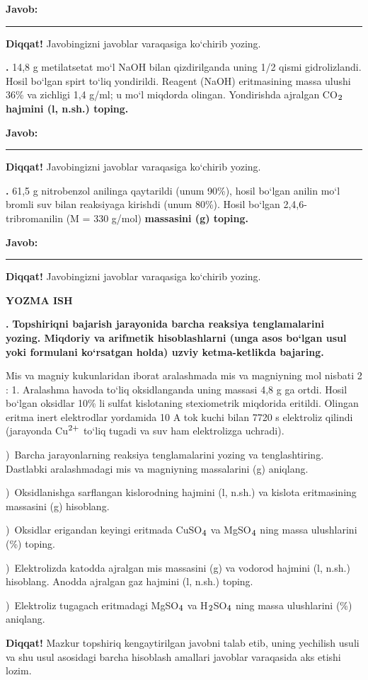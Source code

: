 \documentclass[11pt,a4paper]{article}
\renewcommand{\textsubscript}[1]{\ensuremath{_{\text{\fontsize{8}{8}\selectfont #1}}}}
\renewcommand{\textsuperscript}[1]{\ensuremath{^{\text{\fontsize{8}{8}\selectfont #1}}}}
\newcommand{\qn}[1]{\textbf{\fontsize{11.5}{13}\selectfont #1}}
\newcommand{\qsep}{\par\vspace{13pt}}
\newcommand{\diqqat}[1]{\par\smallskip\noindent\textbf{Diqqat!} #1\par\medskip}
\newcommand{\javob}{\par\nopagebreak[4]\smallskip\noindent\textbf{Javob:} \rule[-2pt]{7.5cm}{0.4pt}\par\smallskip\noindent\textbf{Diqqat!} Javobingizni javoblar varaqasiga ko`chirib yozing.\par\medskip}
\begin{document}
\javob\qsep
\noindent\qn{39.} 14,8 g metilatsetat mo`l NaOH bilan qizdirilganda uning 1/2 qismi gidrolizlandi. Hosil bo`lgan spirt to`liq yondirildi. Reagent (NaOH) eritmasining massa ulushi 36\% va zichligi 1,4 g/ml; u mo`l miqdorda olingan. Yondirishda ajralgan CO\textsubscript{2} \textbf{hajmini (l, n.sh.) toping.}
\javob\qsep
\noindent\qn{40.} 61,5 g nitrobenzol anilinga qaytarildi (unum 90\%), hosil bo`lgan anilin mo`l bromli suv bilan reaksiyaga kirishdi (unum 80\%). Hosil bo`lgan 2,4,6-tribromanilin (M = 330 g/mol) \textbf{massasini (g) toping.}
\javob\qsep
\par\bigskip\begin{center}\textbf{\fontsize{13}{15}\selectfont YOZMA ISH}\end{center}
\noindent\qn{41.} \textbf{Topshiriqni bajarish jarayonida barcha reaksiya tenglamalarini yozing. Miqdoriy va arifmetik hisoblashlarni (unga asos bo`lgan usul yoki formulani ko`rsatgan holda) uzviy ketma-ketlikda bajaring.}\par\smallskip
Mis va magniy kukunlaridan iborat aralashmada mis va magniyning mol nisbati 2 : 1. Aralashma havoda to`liq oksidlanganda uning massasi 4,8 g ga ortdi. Hosil bo`lgan oksidlar 10\% li sulfat kislotaning stexiometrik miqdorida eritildi. Olingan eritma inert elektrodlar yordamida 10 A tok kuchi bilan 7720 s elektroliz qilindi (jarayonda Cu\textsuperscript{2+} to`liq tugadi va suv ham elektrolizga uchradi).\par
{})\ Barcha jarayonlarning reaksiya tenglamalarini yozing va tenglashtiring. Dastlabki aralashmadagi mis va magniyning massalarini (g) aniqlang.\par
{})\ Oksidlanishga sarflangan kislorodning hajmini (l, n.sh.) va kislota eritmasining massasini (g) hisoblang.\par
{})\ Oksidlar erigandan keyingi eritmada CuSO\textsubscript{4} va MgSO\textsubscript{4} ning massa ulushlarini (\%) toping.\par
{})\ Elektrolizda katodda ajralgan mis massasini (g) va vodorod hajmini (l, n.sh.) hisoblang. Anodda ajralgan gaz hajmini (l, n.sh.) toping.\par
{})\ Elektroliz tugagach eritmadagi MgSO\textsubscript{4} va H\textsubscript{2}SO\textsubscript{4} ning massa ulushlarini (\%) aniqlang.\par
\diqqat{Mazkur topshiriq kengaytirilgan javobni talab etib, uning yechilish usuli va shu usul asosidagi barcha hisoblash amallari javoblar varaqasida aks etishi lozim.}\qsep
\end{document}
